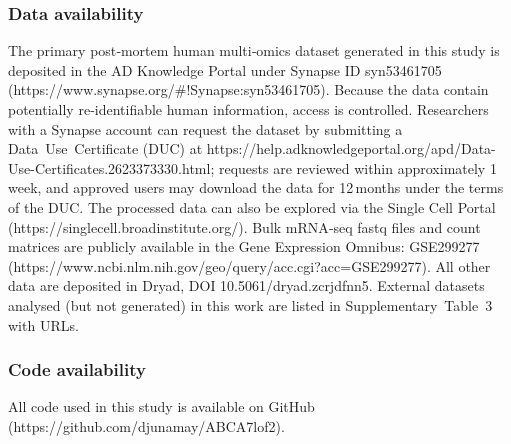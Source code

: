 \subsubsection{Data availability}
The primary post‑mortem human multi‑omics dataset generated in this study is deposited in the AD Knowledge Portal under Synapse ID syn53461705 (https://www.synapse.org/#!Synapse:syn53461705). Because the data contain potentially re‑identifiable human information, access is controlled. Researchers with a Synapse account can request the dataset by submitting a Data Use Certificate (DUC) at https://help.adknowledgeportal.org/apd/Data-Use-Certificates.2623373330.html; requests are reviewed within approximately 1 week, and approved users may download the data for 12 months under the terms of the DUC. The processed data can also be explored via the Single Cell Portal (https://singlecell.broadinstitute.org/). Bulk mRNA‑seq fastq files and count matrices are publicly available in the Gene Expression Omnibus: GSE299277 (https://www.ncbi.nlm.nih.gov/geo/query/acc.cgi?acc=GSE299277). All other data are deposited in Dryad, DOI 10.5061/dryad.zcrjdfnn5. External datasets analysed (but not generated) in this work are listed in Supplementary Table 3 with URLs. 

\subsubsection{Code availability}
All code used in this study is available on GitHub (https://github.com/djunamay/ABCA7lof2).
